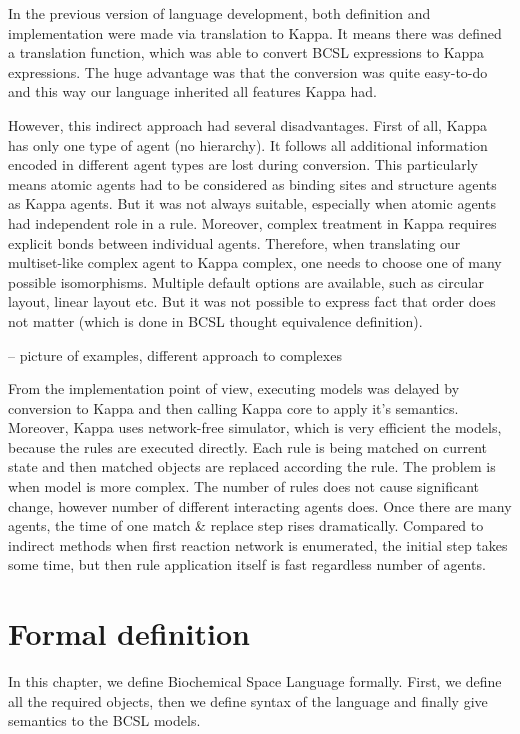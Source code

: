 \documentclass[12pt]{fithesis2}
\begin{document}
In the previous version of language development, both definition and implementation were made via translation to Kappa. It means there was defined a translation function, which was able to convert BCSL expressions to Kappa expressions. The huge advantage was that the conversion was quite easy-to-do and this way our language inherited all features Kappa had.

However, this indirect approach had several disadvantages. First of all, Kappa has only one type of agent (no hierarchy). It follows all additional information encoded in different agent types are lost during conversion. This particularly means atomic agents had to be considered as binding sites and structure agents as Kappa agents. But it was not always suitable, especially when atomic agents had independent role in a rule. Moreover, complex treatment in Kappa requires explicit bonds between individual agents. Therefore, when translating our multiset-like complex agent to Kappa complex, one needs to choose one of many possible isomorphisms. Multiple default options are available, such as circular layout, linear layout etc. But it was not possible to express fact that order does not matter (which is done in BCSL thought equivalence definition).

-- picture of examples, different approach to complexes

From the implementation point of view, executing models was delayed by conversion to Kappa and then calling Kappa core to apply it's semantics. Moreover, Kappa uses network-free simulator, which is very efficient the models, because the rules are executed directly. Each rule is being matched on current state and then matched objects are replaced according the rule. The problem is when model is more complex. The number of rules does not cause significant change, however number of different interacting agents does. Once there are many agents, the time of one match \& replace step rises dramatically. Compared to indirect methods when first reaction network is enumerated, the initial step takes some time, but then rule application itself is fast regardless number of agents. 

\chapter{Formal definition}
\label{formal_definition}

In this chapter, we define Biochemical Space Language formally. First, we define all the required objects, then we define syntax of the language and finally give semantics to the BCSL models.
\end{document}
